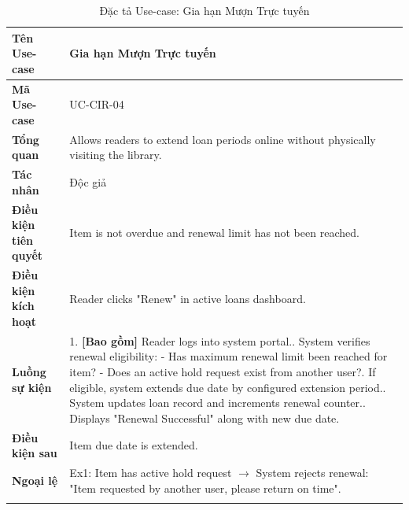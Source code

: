 \newpage
\begin{longtable}{|p{3.5cm}|p{11.5cm}|}
    \hline
    \textbf{Tên Use-case} & \textbf{Gia hạn Mượn Trực tuyến} \\
    \hline
    \textbf{Mã Use-case} & UC-CIR-04 \\
    \hline
    \textbf{Tổng quan} & Allows readers to extend loan periods online without physically visiting the library. \\
    \hline
    \textbf{Tác nhân} & Độc giả \\
    \hline
    \textbf{Điều kiện tiên quyết} & Item is not overdue and renewal limit has not been reached. \\
    \hline
    \textbf{Điều kiện kích hoạt} & Reader clicks "Renew" in active loans dashboard. \\
    \hline
    \textbf{Luồng sự kiện} & 
    1. \textbf{[Bao gồm]} Reader logs into system portal.\newline
    2. System verifies renewal eligibility:\newline
    - Has maximum renewal limit been reached for item?\newline
    - Does an active hold request exist from another user?\newline
    3. If eligible, system extends due date by configured extension period.\newline
    4. System updates loan record and increments renewal counter.\newline
    5. Displays "Renewal Successful" along with new due date. \\
    \hline
    \textbf{Điều kiện sau} & Item due date is extended. \\
    \hline
    \textbf{Ngoại lệ} & 
    Ex1: Item has active hold request $\rightarrow$ System rejects renewal: "Item requested by another user, please return on time". \\
    \hline
    \caption{Đặc tả Use-case: Gia hạn Mượn Trực tuyến}
\end{longtable}


